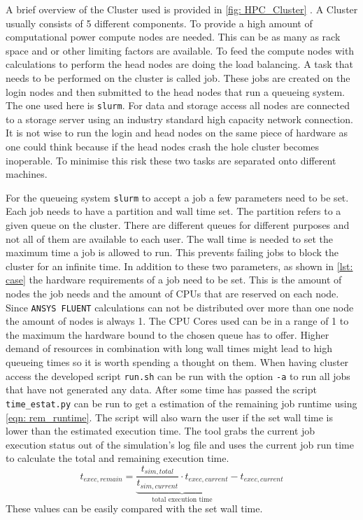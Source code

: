 \documentclass[../thesis.tex]{subfiles}
\begin{document}
A brief overview of the Cluster used is provided in \autoref{fig: HPC_Cluster} \cite{schulz2022hardware_and_num}. A Cluster usually consists of 5 different components. To provide a high amount of computational power compute nodes are needed. This can be as many as rack space and or other limiting factors are available. To feed the compute nodes with calculations to perform the head nodes are doing the load balancing. A task that needs to be performed on the cluster is called job. These jobs are created on the login nodes and then submitted to the head nodes that run a queueing system. The one used here is \texttt{slurm}. For data and storage access all nodes are connected to a storage server using an industry standard high capacity network connection. It is not wise to run the login and head nodes on the same piece of hardware as one could think because if the head nodes crash the hole cluster becomes inoperable. To minimise this risk these two tasks are separated onto different machines.

For the queueing system \texttt{slurm} to accept a job a few parameters need to be set. Each job needs to have a partition and wall time set. The partition refers to a given queue on the cluster. There are different queues for different purposes and not all of them are available to each user.
The wall time is needed to set the maximum time a job is allowed to run. This prevents failing jobs to block the cluster for an infinite time. In addition to these two parameters, as shown in \autoref{lst: case} the hardware requirements of a job need to be set. This is the amount of nodes the job needs and the amount of CPUs that are reserved on each node. Since \texttt{ANSYS FLUENT} calculations can not be distributed over more than one node the amount of nodes is always 1. The CPU Cores used can be in a range of 1 to the maximum the hardware bound to the chosen queue has to offer. Higher demand of resources in combination with long wall times might lead to high queueing times so it is worth spending a thought on them. When having cluster access the developed script \texttt{run.sh} can be run with the option \texttt{-a} to run all jobs that have not generated any data. After some time has passed the script \texttt{time\_estat.py} can be run to get a estimation of the remaining job runtime using \autoref{eqn: rem_runtime}. The script will also warn the user if the set wall time is lower than the estimated execution time. The tool grabs the current job execution status out of the simulation's log file and uses the current job run time to calculate the total and remaining execution time. 
\begin{equation}
	\label{eqn: rem_runtime}
	t_{exec,remain} = \underbrace{\dfrac{t_{sim,total}}{t_{sim,current}} \cdot t_{exec,current}}_{\text{total execution time}}  - t_{exec,current} 
\end{equation}
These values can be easily compared with the set wall time.    
\end{document}
